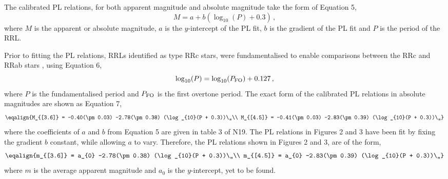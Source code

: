\documentclass[11pt]{iopart}
\begin{document}
The calibrated PL relations, for both apparent magnitude and absolute magnitude take the form of Equation 5,
\begin{equation}
    M = a + b\left(\log_{10}(P) + 0.3\right)\,,
\end{equation}
where $M$ is the apparent or absolute magnitude, $a$ is the $y$-intercept of the PL fit, $b$ is the gradient of the PL fit and $P$ is the period of the RRL.

Prior to fitting the PL relations, RRLs identified as type RRc stars, were fundamentalised to enable comparisons between the RRc and RRab stars \cite{iben1974post}, using Equation 6,
\begin{equation}
    \log_{10}(P) = \log_{10}(P_{\rm FO}) + 0.127\,,
\end{equation}
where $P$ is the fundamentalised period and $P_{\rm FO}$ is the first overtone period. The exact form of the calibrated PL relations in absolute magnitudes are shown as Equation 7,
\begin{equation}
\label{eq:PL}
    \eqalign{M_{[3.6]} = -0.40(\pm 0.03) -2.78(\pm 0.38) (\log_{10}(P + 0.3))\,,\\
    M_{[4.5]} = -0.41(\pm 0.03) -2.83(\pm 0.39) (\log_{10}(P + 0.3))\,,}
\end{equation}
where the coefficients of $a$ and $b$ from Equation 5 are given in table 3 of N19. The PL relations in Figures 2 and 3 have been fit by fixing the gradient $b$ constant, while allowing $a$ to vary. Therefore, the PL relations shown in Figures 2 and 3, are of the form,
\begin{equation}
\label{eq:PL}
    \eqalign{m_{[3.6]} = a_{0} -2.78(\pm 0.38) (\log_{10}(P + 0.3))\,,\\
    m_{[4.5]} = a_{0} -2.83(\pm 0.39) (\log_{10}(P + 0.3))\,,}
\end{equation}
where $m$ is the average apparent magnitude and $a_{0}$ is the $y$-intercept, yet to be found.
\end{document}
